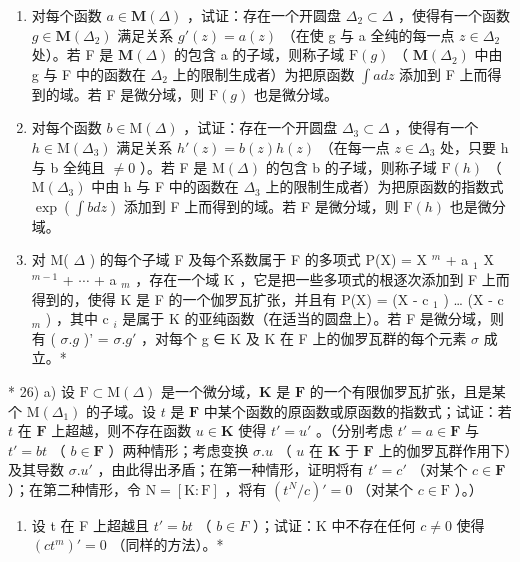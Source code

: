 \begin{enumerate}
\def\labelenumi{\alph{enumi})}
\setcounter{enumi}{1}
\item
  对每个函数 \(a \in \mathbf{M}(\Delta)\) ，试证：存在一个开圆盘 \(\Delta_{2} \subset \Delta\) ，使得有一个函数 \(g \in \mathbf{M}(\Delta_{2})\) 满足关系 \(g'(z) = a(z)\) （在使 g 与 a 全纯的每一点 \(z \in \Delta_{2}\) 处）。若 F 是 \(\mathbf{M}(\Delta)\) 的包含 a 的子域，则称子域 \(\mathrm{F}(g)\) （ \(\mathbf{M}(\Delta_{2})\) 中由 g 与 F 中的函数在 \(\Delta_{2}\) 上的限制生成者）为把原函数 \(\int a dz\) 添加到 F 上而得到的域。若 F 是微分域，则 \(\mathrm{F}(g)\) 也是微分域。
\item
  对每个函数 \(b \in \mathrm{M}(\Delta)\) ，试证：存在一个开圆盘 \(\Delta_{3} \subset \Delta\) ，使得有一个 \(h \in \mathrm{M}(\Delta_{3})\) 满足关系 \(h'(z) = b(z)h(z)\) （在每一点 \(z \in \Delta_{3}\) 处，只要 h 与 b 全纯且 \(\neq 0\) ）。若 F 是 \(\mathrm{M}(\Delta)\) 的包含 b 的子域，则称子域 \(\mathrm{F}(h)\) （ \(\mathrm{M}(\Delta_{3})\) 中由 h 与 F 中的函数在 \(\Delta_{3}\) 上的限制生成者）为把原函数的指数式 \(\exp\left(\int bdz\right)\) 添加到 F 上而得到的域。若 F 是微分域，则 \(\mathrm{F}(h)\) 也是微分域。
\item
  对 M( \(\Delta\) ) 的每个子域 F 及每个系数属于 F 的多项式 P(X) = X \(^{m}\) + a \(_{1}\) X \(^{m-1}\) + \(\cdots\) + a \(_{m}\) ，存在一个域 K ，它是把一些多项式的根逐次添加到 F 上而得到的，使得 K 是 F 的一个伽罗瓦扩张，并且有 P(X) = (X - c \(_{1}\) ) \ldots{} (X - c \(_{m}\) ) ，其中 c \(_{i}\) 是属于 K 的亚纯函数（在适当的圆盘上）。若 F 是微分域，则有 ( \(\sigma.g\) )' = \(\sigma.g'\) ，对每个 g ∈ K 及 K 在 F 上的伽罗瓦群的每个元素 \(\sigma\) 成立。*
\end{enumerate}

* 26) a) 设 \(\mathrm{F} \subset \mathrm{M}(\Delta)\) 是一个微分域，\(\mathbf{K}\) 是 \(\mathbf{F}\) 的一个有限伽罗瓦扩张，且是某个 \(\mathrm{M}(\Delta_1)\) 的子域。设 \(t\) 是 \(\mathbf{F}\) 中某个函数的原函数或原函数的指数式；试证：若 \(t\) 在 \(\mathbf{F}\) 上超越，则不存在函数 \(u \in \mathbf{K}\) 使得 \(t' = u'\) 。（分别考虑 \(t' = a \in \mathbf{F}\) 与 \(t' = bt\) （ \(b \in \mathbf{F}\) ）两种情形；考虑变换 \(\sigma.u\) （ \(u\) 在 \(\mathbf{K}\) 于 \(\mathbf{F}\) 上的伽罗瓦群作用下）及其导数 \(\sigma.u'\) ，由此得出矛盾；在第一种情形，证明将有 \(t' = c'\) （对某个 \(c \in \mathbf{F}\) ）；在第二种情形，令 \(\mathrm{N} = [\mathrm{K}: \mathrm{F}]\) ，将有 \((t^{N}/c)' = 0\) （对某个 \(c \in \mathrm{F}\) ）。）

\begin{enumerate}
\def\labelenumi{\alph{enumi})}
\setcounter{enumi}{1}
\tightlist
\item
  设 t 在 F 上超越且 \(t' = bt\) （ \(b \in F\) ）；试证：K 中不存在任何 \(c \neq 0\) 使得 \((ct^{m})' = 0\) （同样的方法）。*
\end{enumerate}

